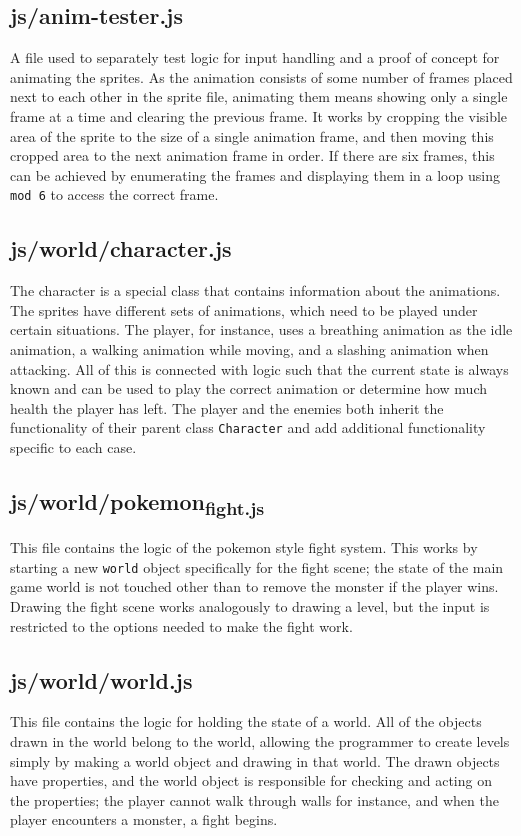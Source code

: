 \documentclass[11pt]{article}
\begin{document}
\subsection{js/anim-tester.js}
\label{sec:org75e14f4}
A file used to separately test logic for input handling and a proof of concept for animating the sprites. As the animation consists of some number of frames placed next to each other in the sprite file, animating them means showing only a single frame at a time and clearing the previous frame. It works by cropping the visible area of the sprite to the size of a single animation frame, and then moving this cropped area to the next animation frame in order. If there are six frames, this can be achieved by enumerating the frames and displaying them in a loop using \texttt{mod 6} to access the correct frame.\\
\subsection{js/world/character.js}
\label{sec:orga5047b9}
The character is a special class that contains information about the animations. The sprites have different sets of animations, which need to be played under certain situations. The player, for instance, uses a breathing animation as the idle animation, a walking animation while moving, and a slashing animation when attacking. All of this is connected with logic such that the current state is always known and can be used to play the correct animation or determine how much health the player has left. The player and the enemies both inherit the functionality of their parent class \texttt{Character} and add additional functionality specific to each case.\\
\subsection{js/world/pokemon\textsubscript{fight.js}}
\label{sec:org13e10af}
This file contains the logic of the pokemon style fight system. This works by starting a new \texttt{world} object specifically for the fight scene; the state of the main game world is not touched other than to remove the monster if the player wins. Drawing the fight scene works analogously to drawing a level, but the input is restricted to the options needed to make the fight work.\\
\subsection{js/world/world.js}
\label{sec:org8d99762}
This file contains the logic for holding the state of a world. All of the objects drawn in the world belong to the world, allowing the programmer to create levels simply by making a world object and drawing in that world. The drawn objects have properties, and the world object is responsible for checking and acting on the properties; the player cannot walk through walls for instance, and when the player encounters a monster, a fight begins.\\
\end{document}
